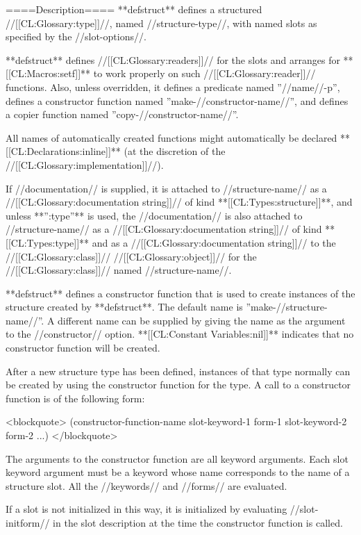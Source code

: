 ====Description====
**defstruct** defines a structured //[[CL:Glossary:type]]//, named //structure-type//, with named slots as specified by the //slot-options//.

**defstruct** defines //[[CL:Glossary:readers]]// for the slots and arranges for **[[CL:Macros:setf]]** to work properly on such //[[CL:Glossary:reader]]// functions. Also, unless overridden, it defines a predicate named ''//name//-p'', defines a constructor function named ''make-//constructor-name//'', and defines a copier function named ''copy-//constructor-name//''.

All names of automatically created functions might automatically be declared **[[CL:Declarations:inline]]** (at the discretion of the //[[CL:Glossary:implementation]]//).

If //documentation// is supplied, it is attached to //structure-name// as a //[[CL:Glossary:documentation string]]// of kind **[[CL:Types:structure]]**, and unless **'':type''** is used, the //documentation// is also attached to //structure-name// as a //[[CL:Glossary:documentation string]]// of kind **[[CL:Types:type]]** and as a //[[CL:Glossary:documentation string]]// to the //[[CL:Glossary:class]]// //[[CL:Glossary:object]]// for the //[[CL:Glossary:class]]// named //structure-name//.

**defstruct** defines a constructor function that is used to create instances of the structure created by **defstruct**. The default name is ''make-//structure-name//''. A different name can be supplied by giving the name as the argument to the //constructor// option. **[[CL:Constant Variables:nil]]** indicates that no constructor function will be created.

After a new structure type has been defined, instances of that type normally can be created by using the constructor function for the type. A call to a constructor function is of the following form:

<blockquote>
(constructor-function-name
 slot-keyword-1 form-1
 slot-keyword-2 form-2
 ...)
 </blockquote>

The arguments to the constructor function are all keyword arguments. Each slot keyword argument must be a keyword whose name corresponds to the name of a structure slot. All the //keywords// and //forms// are evaluated.

If a slot is not initialized in this way, it is initialized by evaluating //slot-initform// in the slot description at the time the constructor function is called.

